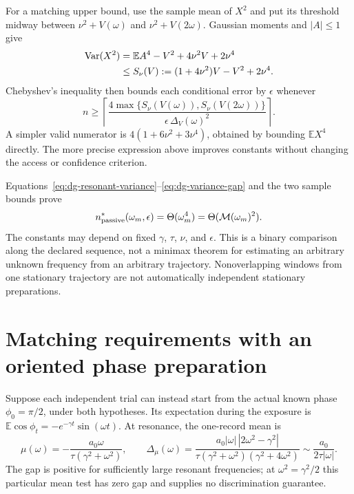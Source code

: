 For a matching upper bound, use the sample mean of $X^2$ and put its threshold
midway between $\nu^2+V(\omega)$ and $\nu^2+V(2\omega)$. Gaussian moments
and $|A|\leq1$ give
\begin{align}
 \operatorname{Var}(X^2)
 &=\mathbb E A^4-V^2+4\nu^2V+2\nu^4\notag\\
 &\leq S_\nu(V):=(1+4\nu^2)V-V^2+2\nu^4.
 \label{eq:dg-square-variance}
\end{align}
Chebyshev's inequality then bounds each conditional error by $\epsilon$
whenever
\begin{equation}
 n\geq
 \left\lceil
 \frac{4\max\{S_\nu(V(\omega)),S_\nu(V(2\omega))\}}
      {\epsilon\,\Delta_V(\omega)^2}
 \right\rceil.
 \label{eq:dg-passive-sufficient}
\end{equation}
A simpler valid numerator is $4(1+6\nu^2+3\nu^4)$, obtained by bounding
$\mathbb E X^4$ directly. The more precise expression above improves
constants without changing the access or confidence criterion.

Equations~\eqref{eq:dg-resonant-variance}--\eqref{eq:dg-variance-gap}
and the two sample bounds prove
\begin{equation}
 n^*_{\rm passive}(\omega_m,\epsilon)=\Theta(\omega_m^4)
      =\Theta(\mathcal M(\omega_m)^2).
 \label{eq:dg-passive-rate}
\end{equation}
The constants may depend on fixed $\gamma$, $\tau$, $\nu$, and
$\epsilon$. This is a binary comparison along the declared sequence,
not a minimax theorem for estimating an arbitrary unknown frequency from
an arbitrary trajectory. Nonoverlapping windows from one stationary
trajectory are not automatically independent stationary preparations.

\section{Matching requirements with an oriented phase preparation}

Suppose each independent trial can instead start from the actual known
phase $\phi_0=\pi/2$, under both hypotheses. Its expectation during the
exposure is $\mathbb E\cos\phi_t=-e^{-\gamma t}\sin(\omega t)$.
At resonance, the one-record mean is
\begin{equation}
 \mu(\omega)=-\frac{a_0\omega}{\tau(\gamma^2+\omega^2)},\qquad
 \Delta_\mu(\omega)
 =\frac{a_0|\omega|\,|2\omega^2-\gamma^2|}
        {\tau(\gamma^2+\omega^2)(\gamma^2+4\omega^2)}
 \sim\frac{a_0}{2\tau|\omega|}.
 \label{eq:dg-prepared-mean}
\end{equation}
The gap is positive for sufficiently large resonant frequencies; at
$\omega^2=\gamma^2/2$ this particular mean test has zero gap and supplies
no discrimination guarantee.

